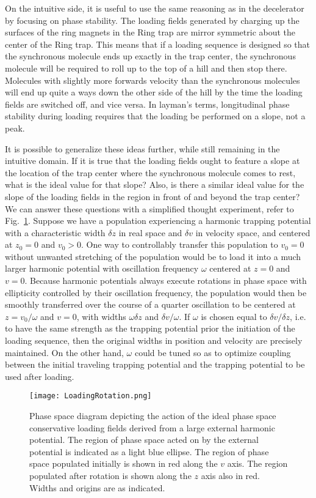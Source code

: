 On the intuitive side, it is useful to use the same reasoning as in the decelerator by focusing on phase stability.
The loading fields generated by charging up the surfaces of the ring magnets in the Ring trap are mirror symmetric about the center of the Ring trap.
This means that if a loading sequence is designed so that the synchronous molecule ends up exactly in the trap center, the synchronous molecule will be required to roll up to the top of a hill and then stop there. 
Molecules with slightly more forwards velocity than the synchronous molecules will end up quite a ways down the other side of the hill by the time the loading fields are switched off, and vice versa.
In layman's terms, longitudinal phase stability during loading requires that the loading be performed on a slope, not a peak.

It is possible to generalize these ideas further, while still remaining in the intuitive domain.
If it is true that the loading fields ought to feature a slope at the location of the trap center where the synchronous molecule comes to rest, what is the ideal value for that slope?
Also, is there a similar ideal value for the slope of the loading fields in the region in front of and beyond the trap center?
We can answer these questions with a simplified thought experiment, refer to Fig.~\ref{LoadingRotation}.
Suppose we have a population experiencing a harmonic trapping potential with a characteristic width $\delta z$ in real space and $\delta v$ in velocity space, and centered at $z_0=0$ and $v_0 > 0$.
One way to controllably transfer this population to $v_0=0$ without unwanted stretching of the population would be to load it into a much larger harmonic potential with oscillation frequency $\omega$ centered at $z=0$ and $v=0$.
Because harmonic potentials always execute rotations in phase space with ellipticity controlled by their oscillation frequency, the population would then be smoothly transferred over the course of a quarter oscillation to be centered at $z = v_0/\omega$ and $v=0$, with widths $\omega\delta z$ and $\delta v/\omega$.
If $\omega$ is chosen equal to $\delta v/\delta z$, i.e. to have the same strength as the trapping potential prior the initiation of the loading sequence, then the original widths in position and velocity are precisely maintained.
On the other hand, $\omega$ could be tuned so as to optimize coupling between the initial traveling trapping potential and the trapping potential to be used after loading.

\begin{figure}[t!]
\centering
\texttt{[image: LoadingRotation.png]}
\caption[Ideal Trap Loading as a Quarter Rotation]{\label{LoadingRotation}
Phase space diagram depicting the action of the ideal phase space conservative loading fields derived from a large external harmonic potential. The region of phase space acted on by the external potential is indicated as a light blue ellipse. The region of phase space populated initially is shown in red along the $v$ axis. The region populated after rotation is shown along the $z$ axis also in red. Widths and origins are as indicated.
}
\end{figure}

